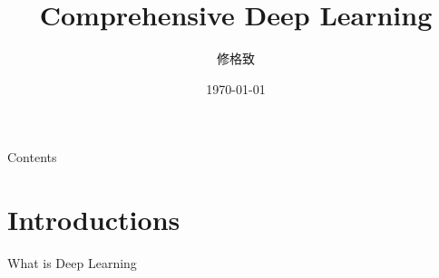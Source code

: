 \documentclass{beamer}
\title{Comprehensive Deep Learning}
\author{修格致}
\institute{IRSGIS\\ Peking University}
\date{\today}
\begin{document}
    \maketitle    
\begin{frame}{Contents}
    \tableofcontents
\end{frame}
\section{Introductions}
\begin{frame}{What is Deep Learning}
    
\end{frame}
\end{document}
